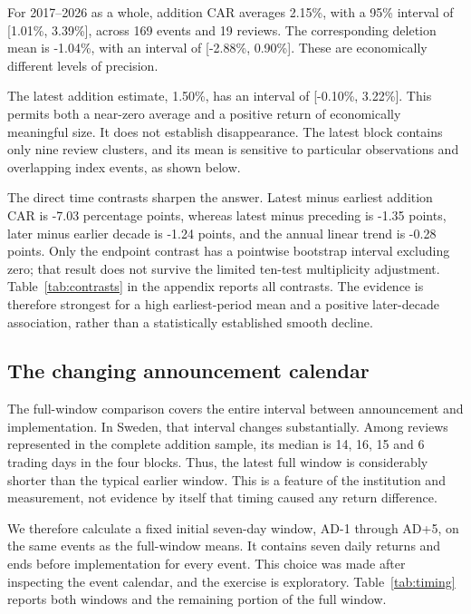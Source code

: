 For 2017--2026 as a whole, addition CAR averages 2.15\%, with a 95\% interval of [1.01\%, 3.39\%], across 169 events and 19 reviews. The corresponding deletion mean is -1.04\%, with an interval of [-2.88\%, 0.90\%]. These are economically different levels of precision. 

The latest addition estimate, 1.50\%, has an interval of [-0.10\%, 3.22\%]. This permits both a near-zero average and a positive return of economically meaningful size. It does not establish disappearance. The latest block contains only nine review clusters, and its mean is sensitive to particular observations and overlapping index events, as shown below.

The direct time contrasts sharpen the answer. Latest minus earliest addition CAR is -7.03 percentage points, whereas latest minus preceding is -1.35 points, later minus earlier decade is -1.24 points, and the annual linear trend is -0.28 points. Only the endpoint contrast has a pointwise bootstrap interval excluding zero; that result does not survive the limited ten-test multiplicity adjustment. Table~\ref{tab:contrasts} in the appendix reports all contrasts. The evidence is therefore strongest for a high earliest-period mean and a positive later-decade association, rather than a statistically established smooth decline.

\subsection{The changing announcement calendar}

The full-window comparison covers the entire interval between announcement and implementation. In Sweden, that interval changes substantially. Among reviews represented in the complete addition sample, its median is 14, 16, 15 and 6 trading days in the four blocks. Thus, the latest full window is considerably shorter than the typical earlier window. This is a feature of the institution and measurement, not evidence by itself that timing caused any return difference.

We therefore calculate a fixed initial seven-day window, AD-1 through AD+5, on the same events as the full-window means. It contains seven daily returns and ends before implementation for every event. This choice was made after inspecting the event calendar, and the exercise is exploratory. Table~\ref{tab:timing} reports both windows and the remaining portion of the full window.



